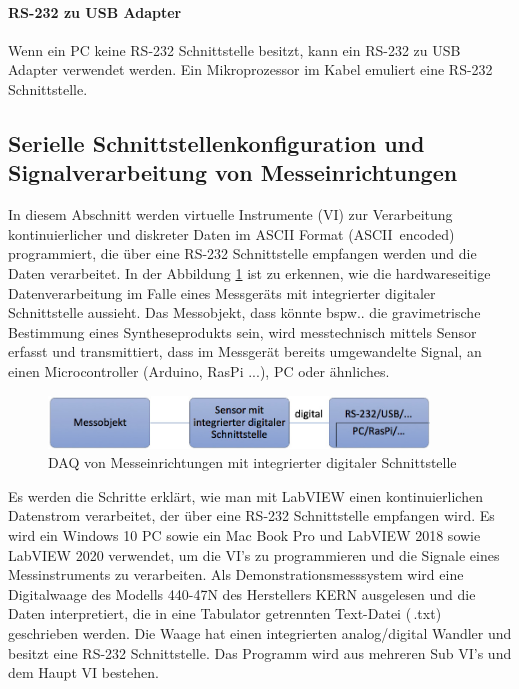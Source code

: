 \paragraph*{RS-232 zu USB Adapter} Wenn ein PC keine RS-232 Schnittstelle besitzt, kann ein RS-232 zu USB Adapter verwendet werden. Ein Mikroprozessor im Kabel emuliert eine RS-232 Schnittstelle. \\

\subsection{Serielle Schnittstellenkonfiguration und Signalverarbeitung von Messeinrichtungen}

In diesem Abschnitt werden virtuelle Instrumente (VI) zur Verarbeitung kontinuierlicher und diskreter Daten im ASCII Format (ASCII \,{\Menlo encoded}) programmiert, die über eine RS-232 Schnittstelle empfangen werden und die Daten verarbeitet. In der Abbildung \ref{fig:sensor_digitale_schnittstelle} ist zu erkennen, wie die hardwareseitige Datenverarbeitung im Falle eines Messgeräts mit integrierter digitaler Schnittstelle aussieht. Das Messobjekt, dass könnte bspw.. die gravimetrische Bestimmung eines Syntheseprodukts sein, wird messtechnisch mittels Sensor erfasst und transmittiert, dass im Messgerät bereits umgewandelte Signal, an einen Microcontroller (Arduino, RasPi ...), PC oder ähnliches.

\begin{figure}[h!] %
\centering
\includegraphics[width=0.9\textwidth]{Bilder/sensor_digitale_schnittstelle.jpg}
\vspace{0em}
 \caption[DAQ von Messeinrichtungen mit integrierter digitaler Schnittstelle]{DAQ von Messeinrichtungen mit integrierter digitaler Schnittstelle}\label{fig:sensor_digitale_schnittstelle}
\end{figure}

 Es werden die Schritte erklärt, wie man mit LabVIEW einen kontinuierlichen Datenstrom verarbeitet, der über eine RS-232 Schnittstelle empfangen wird. Es wird ein Windows 10 PC sowie ein Mac Book Pro und LabVIEW 2018 sowie LabVIEW 2020 verwendet, um die VI's zu programmieren und die Signale eines Messinstruments zu verarbeiten. Als Demonstrationsmesssystem wird eine Digitalwaage des Modells 440-47N des Herstellers KERN ausgelesen und die Daten interpretiert, die in eine Tabulator getrennten Text-Datei (\,{\Menlo *.txt}) geschrieben werden. Die Waage hat einen integrierten analog/digital Wandler und besitzt eine RS-232 Schnittstelle. Das Programm wird aus mehreren Sub VI's und dem Haupt VI bestehen. \\

